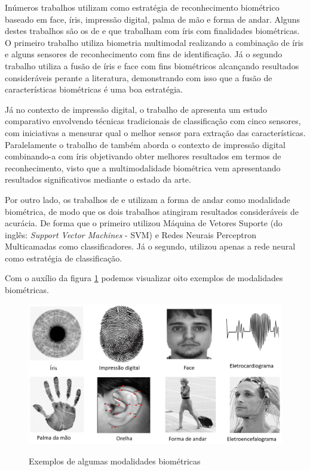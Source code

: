 Inúmeros trabalhos utilizam como estratégia de reconhecimento biométrico baseado em face, íris, impressão digital, palma de mão e forma de andar. Alguns destes trabalhos são os de  e  que trabalham com íris com finalidades biométricas. O primeiro trabalho utiliza biometria multimodal realizando a combinação de íris e alguns sensores de reconhecimento com fins de identificação. Já o segundo trabalho utiliza a fusão de íris e face com fins biométricos alcançando resultados consideráveis perante a literatura, demonstrando com isso que a fusão de características biométricas é uma boa estratégia.

Já no contexto de impressão digital, o trabalho de  apresenta um estudo comparativo envolvendo técnicas tradicionais de classificação com cinco sensores, com iniciativas a mensurar qual o melhor sensor para extração das características. Paralelamente o trabalho de  também aborda o contexto de impressão digital combinando-a com íris objetivando obter melhores resultados em termos de reconhecimento, visto que a multimodalidade biométrica vem apresentando resultados significativos mediante o estado da arte.

Por outro lado, os trabalhos de  e  utilizam a forma de andar como modalidade biométrica, de modo que os dois trabalhos atingiram resultados consideráveis de acurácia. De forma que o primeiro utilizou Máquina de Vetores Suporte (do inglês: \textit{Support Vector Machines} - SVM) e Redes Neurais Perceptron Multicamadas como classificadores. Já o segundo, utilizou apenas a rede neural como estratégia de classificação.

Com o auxílio da figura \ref{fig:exemplo_modalidades_biometricas} podemos visualizar oito exemplos de modalidades biométricas.


\begin{figure}[H]
\centering
\caption{Exemplos de algumas modalidades biométricas }
\includegraphics[scale = 0.38]{imgs3/modalidades_biometricas}
\label{fig:exemplo_modalidades_biometricas}
\end{figure}






